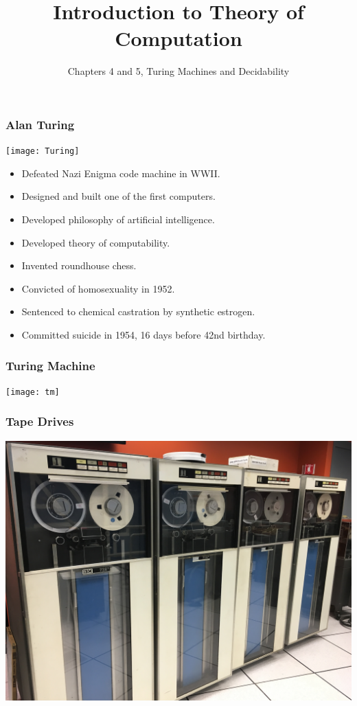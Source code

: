 \documentclass{beamer}
\title{Introduction to Theory of Computation}
\author{Chapters 4 and 5, Turing Machines and Decidability}
\newcommand{\bfr}[1]{\begin{frame}[fragile]\frametitle{{ #1 }}}
\begin{document}
\begin{frame}
\maketitle

\end{frame}

\bfr{Alan Turing}
\begin{multicols}{2}
\texttt{[image: Turing]}
\columnbreak
\begin{itemize}
  \pause
\item Defeated Nazi Enigma code machine in WWII.
  \pause
\item Designed and built one of the first computers.
  \pause
\item Developed philosophy of artificial intelligence.
  \pause
\item Developed theory of computability.
  \pause
\item Invented roundhouse chess.
  \pause
\end{itemize}
\end{multicols}

\begin{itemize}
\item Convicted of homosexuality in 1952.
  \pause
\item Sentenced to chemical castration by synthetic estrogen.
  \pause
\item Committed suicide in 1954, 16 days before 42nd birthday.
\end{itemize}

\end{frame}

\bfr{Turing Machine}
\texttt{[image: tm]}
\end{frame}

\bfr{Tape Drives}
\includegraphics[width=\textwidth]{tapedrives}
\end{frame}
\end{document}
